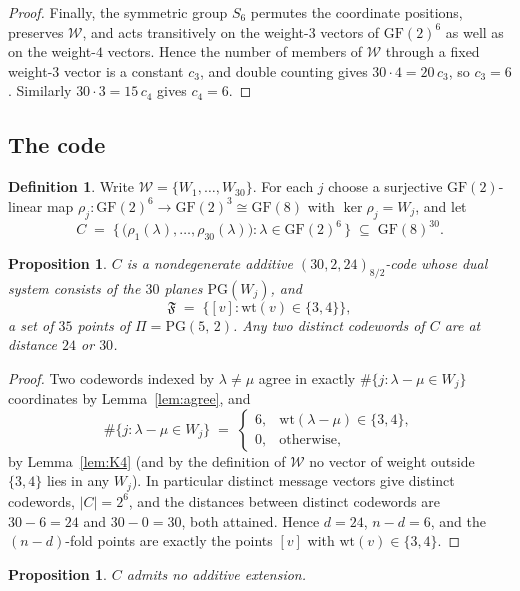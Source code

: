 \documentclass[12pt]{article}
\newtheorem{prop}[thm]{Proposition}
\theoremstyle{definition}
\newtheorem{defn}[thm]{Definition}
\numberwithin{equation}{section}
\newcommand{\la}{\lambda}
\newcommand{\W}{\mathcal{W}}
\newcommand{\GF}[1]{\mathrm{GF}(#1)}
\newcommand{\PG}[2]{\mathrm{PG}(#1,\,#2)}
\newcommand{\PGv}[1]{\mathrm{PG}(#1)}
\newcommand{\wt}{\mathrm{wt}}
\newcommand{\Afold}{\mathfrak{F}}
\begin{document}
\begin{proof}
Finally, the symmetric group $S_6$ permutes the coordinate positions, preserves $\W$, and acts transitively on the weight-$3$ vectors of $\GF2^6$ as well as on the weight-$4$ vectors.  Hence the number of members of $\W$ through a fixed weight-$3$ vector is a constant $c_3$, and double counting gives $30\cdot4=20\,c_3$, so $c_3=6$. Similarly $30\cdot3=15\,c_4$ gives $c_4=6$.
\end{proof}

\subsection*{The code}

\begin{defn}\label{defn:codeC}
Write $\W=\{W_1,\ldots,W_{30}\}$.  For each $j$ choose a surjective $\GF2$-linear map $\rho_j:\GF2^6\to\GF2^3\cong\GF8$ with $\ker\rho_j=W_j$, and let
\[
  C \;=\;\bigl\{\,\bigl(\rho_1(\la),\ldots,\rho_{30}(\la)\bigr) :
  \la\in\GF2^6\,\bigr\}\;\subseteq\;\GF8^{30}.
\]
\end{defn}

\begin{prop}\label{prop:codeC}
$C$ is a nondegenerate additive $(30,2,24)_{8/2}$-code whose dual system consists of the $30$ planes $\PGv{W_j}$, and
\[
  \Afold \;=\; \bigl\{[v] : \wt(v)\in\{3,4\}\bigr\},
\]
a set of $35$ points of $\Pi=\PG52$.  Any two distinct codewords of $C$ are at distance $24$ or $30$.
\end{prop}

\begin{proof}
Two codewords indexed by $\la\neq\mu$ agree in exactly $\#\{j : \la-\mu\in W_j\}$ coordinates by Lemma~\ref{lem:agree}, and
\[
  \#\{j : \la-\mu\in W_j\} \;=\;
  \begin{cases}
    6, & \wt(\la-\mu)\in\{3,4\},\\
    0, & \text{otherwise},
  \end{cases}
\]
 by Lemma~\ref{lem:K4} (and by the definition of $\W$ no vector of weight outside $\{3,4\}$ lies in any $W_j$).  In particular distinct message vectors give distinct codewords, $|C|=2^6$, and the distances between distinct codewords are $30-6=24$ and $30-0=30$, both attained.  Hence $d=24$, $n-d=6$, and the $(n-d)$-fold points are exactly the points $[v]$ with $\wt(v)\in\{3,4\}$.
\end{proof}

\begin{prop}\label{prop:noadd}
$C$ admits no additive extension.
\end{prop}
\end{document}
